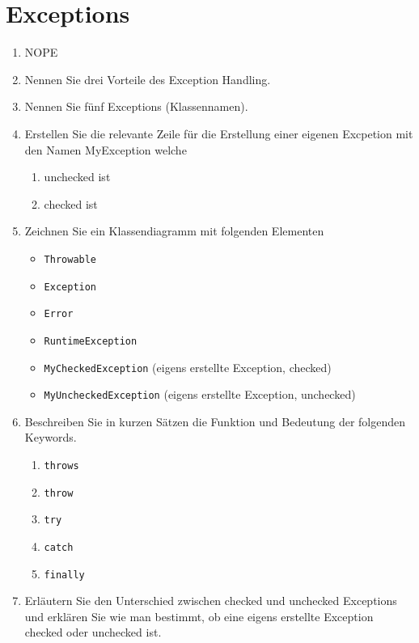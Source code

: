 \newpage
\section{Exceptions}

\begin{enumerate}
    \item NOPE
    \item Nennen Sie drei Vorteile des Exception Handling.
    \item Nennen Sie fünf Exceptions (Klassennamen).
    \item Erstellen Sie die relevante Zeile für die Erstellung einer eigenen
        Excpetion mit den Namen MyException welche
        \begin{enumerate}[label=(\alph*)]
            \item unchecked ist
            \item checked ist
        \end{enumerate}
    \item Zeichnen Sie ein Klassendiagramm mit folgenden Elementen
        \begin{itemize}
            \item \verb?Throwable?
            \item \verb?Exception?
            \item \verb?Error?
            \item \verb?RuntimeException?
            \item \verb?MyCheckedException? (eigens erstellte Exception, checked)
            \item \verb?MyUncheckedException? (eigens erstellte Exception, unchecked)
        \end{itemize}
    \item Beschreiben Sie in kurzen Sätzen die Funktion und Bedeutung
        der folgenden Keywords.
        \begin{enumerate}[label=(\alph*)]
            \item \verb?throws?
            \item \verb?throw?
            \item \verb?try?
            \item \verb?catch?
            \item \verb?finally?
        \end{enumerate}
    \item Erläutern Sie den Unterschied zwischen checked und unchecked 
        Exceptions und erklären Sie wie man bestimmt, ob eine eigens
        erstellte Exception checked oder unchecked ist.
\end{enumerate}
